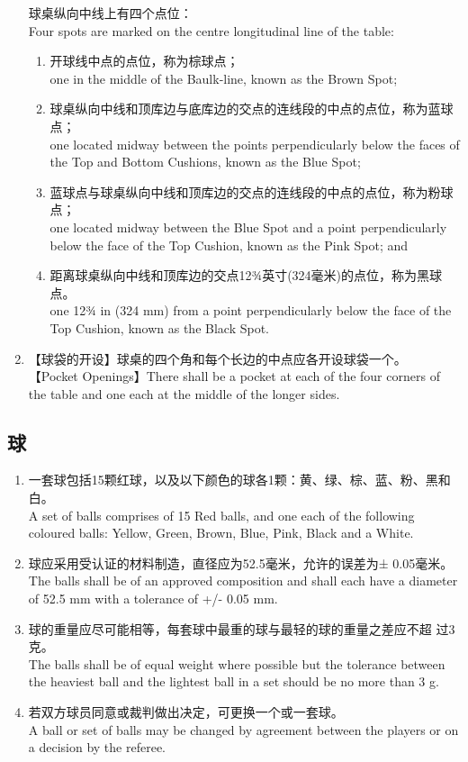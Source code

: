 \begin{enumerate}[label=(\alph*)]
    球桌纵向中线上有四个点位：\\
    Four spots are marked on the centre longitudinal line of the table:
    \begin{enumerate}[label=(\roman*)]
        \item 开球线中点的点位，称为棕球点；\\
        one in the middle of the Baulk-line, known as the Brown Spot;
        \item 球桌纵向中线和顶库边与底库边的交点的连线段的中点的点位，称为蓝球点；\\
        one located midway between the points perpendicularly below the faces of the Top and Bottom Cushions, known as the Blue Spot;
        \item 蓝球点与球桌纵向中线和顶库边的交点的连线段的中点的点位，称为粉球点；\\
        one located midway between the Blue Spot and a point perpendicularly below the face of the Top Cushion, known as the Pink Spot; and        \item 距离球桌纵向中线和顶库边的交点12¾英寸(324毫米)的点位，称为黑球点。\\
        one 12¾ in (324 mm) from a point perpendicularly below the face of the Top Cushion, known as the Black Spot.
    \end{enumerate}
    \item【球袋的开设】球桌的四个角和每个长边的中点应各开设球袋一个。\\
    【Pocket Openings】There shall be a pocket at each of the four corners of the table and one each at the middle of the longer sides.
\end{enumerate}

\subsection{球}

\begin{enumerate}
    \item 一套球包括15颗红球，以及以下颜色的球各1颗：黄、绿、棕、蓝、粉、黑和白。\\
    A set of balls comprises of 15 Red balls, and one each of the following coloured balls: Yellow, Green, Brown, Blue, Pink, Black and a White. 
    \item 球应采用受认证的材料制造，直径应为52.5毫米，允许的误差为± 0.05毫米。\\
    The balls shall be of an approved composition and shall each have a diameter of 52.5 mm with a tolerance of +/- 0.05 mm. 
    \item 球的重量应尽可能相等，每套球中最重的球与最轻的球的重量之差应不超
    过3克。\\
    The balls shall be of equal weight where possible but the tolerance between the heaviest ball and the lightest ball in a set should be no more than 3 g.
    \item 若双方球员同意或裁判做出决定，可更换一个或一套球。\\
    A ball or set of balls may be changed by agreement between the players or on a decision by the referee.
\end{enumerate}

